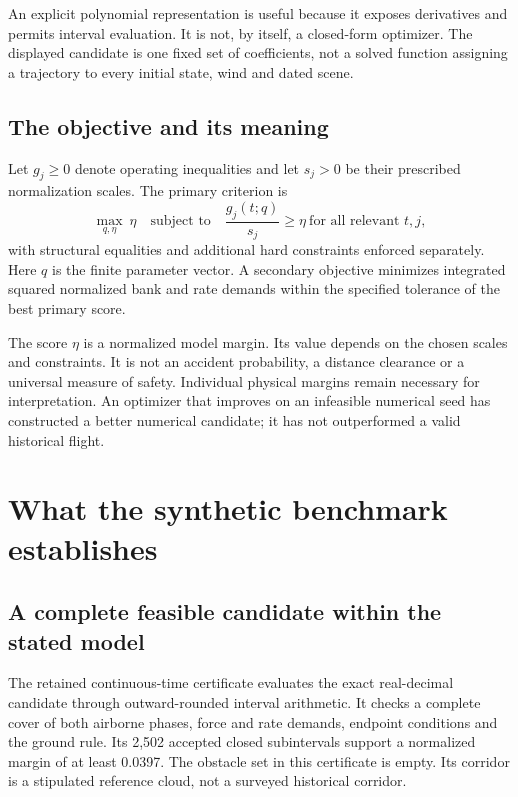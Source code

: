 An explicit polynomial representation is useful because it exposes derivatives and permits interval evaluation. It is not, by itself, a closed-form optimizer. The displayed candidate is one fixed set of coefficients, not a solved function assigning a trajectory to every initial state, wind and dated scene.

\subsection{The objective and its meaning}
Let $g_j\geq0$ denote operating inequalities and let $s_j>0$ be their prescribed normalization scales. The primary criterion is
\begin{equation}
\max_{q,\eta}\ \eta\quad\text{subject to}\quad
\frac{g_j(t;q)}{s_j}\geq\eta\ \text{for all relevant }t,j,
\label{eq:objective}
\end{equation}
with structural equalities and additional hard constraints enforced separately. Here $q$ is the finite parameter vector. A secondary objective minimizes integrated squared normalized bank and rate demands within the specified tolerance of the best primary score.

The score $\eta$ is a normalized model margin. Its value depends on the chosen scales and constraints. It is not an accident probability, a distance clearance or a universal measure of safety. Individual physical margins remain necessary for interpretation. An optimizer that improves on an infeasible numerical seed has constructed a better numerical candidate; it has not outperformed a valid historical flight.

\section{What the synthetic benchmark establishes}
\label{sec:results}
\subsection{A complete feasible candidate within the stated model}
The retained continuous-time certificate evaluates the exact real-decimal candidate through outward-rounded interval arithmetic. It checks a complete cover of both airborne phases, force and rate demands, endpoint conditions and the ground rule. Its 2,502 accepted closed subintervals support a normalized margin of at least 0.0397. The obstacle set in this certificate is empty. Its corridor is a stipulated reference cloud, not a surveyed historical corridor.

